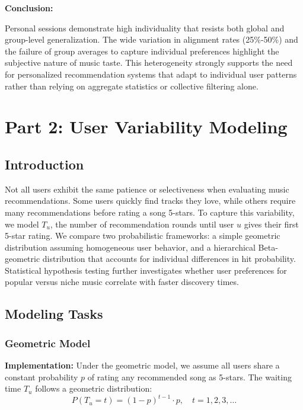 \documentclass[12pt,a4paper]{article}
\begin{document}
\textbf{Conclusion:}

Personal sessions demonstrate high individuality that resists both global and group-level generalization. The wide variation in alignment rates (25\%-50\%) and the failure of group averages to capture individual preferences highlight the subjective nature of music taste. This heterogeneity strongly supports the need for personalized recommendation systems that adapt to individual user patterns rather than relying on aggregate statistics or collective filtering alone.

\section{Part 2: User Variability Modeling}

\subsection{Introduction}
Not all users exhibit the same patience or selectiveness when evaluating music recommendations. Some users quickly find tracks they love, while others require many recommendations before rating a song 5-stars. To capture this variability, we model $T_u$, the number of recommendation rounds until user $u$ gives their first 5-star rating. We compare two probabilistic frameworks: a simple geometric distribution assuming homogeneous user behavior, and a hierarchical Beta-geometric distribution that accounts for individual differences in hit probability. Statistical hypothesis testing further investigates whether user preferences for popular versus niche music correlate with faster discovery times.

\subsection{Modeling Tasks}

\subsubsection{Geometric Model}

\textbf{Implementation:} Under the geometric model, we assume all users share a constant probability $p$ of rating any recommended song as 5-stars. The waiting time $T_u$ follows a geometric distribution:
\begin{equation}
P(T_u = t) = (1-p)^{t-1} \cdot p, \quad t = 1, 2, 3, \ldots
\end{equation}
\end{document}
